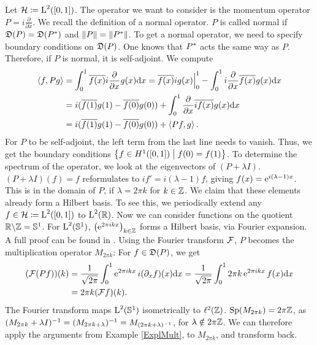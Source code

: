 \begin{expl}
 
 Let $\mathcal{H} \coloneqq \text{L}^2(\left[ 0, 1 \right])$. 
 The operator we want to consider is the momentum operator 
 $P = i \frac{\partial}{\partial x}$.
 We recall the definition of a normal operator.
 $P$ is called normal if $\mathfrak{D}(P) = \mathfrak{D}(P^{*})$ and 
 $\|P\| = \| P ^{*} \|$. To get a normal operator, we
 need to specify boundary conditions on $\mathfrak{D}(P)$. One knows that
 $P^{*}$ acts the same way as $P$. Therefore, if $P$ is normal,
 it is self-adjoint.
 We compute
 \begin{align*}
  \left\langle f, Pg \right\rangle 
 & =\int _0 ^1 \overline{f(x)} i \frac{\partial}{\partial x}g(x) \text{d}x
  = \overline{f(x)}ig(x)\Bigr|^{1}_{0}
  -\int _0 ^1 i \frac{\partial}{\partial x}\overline{f(x)} g(x) \text{d}x\\
&= i(\overline{f(1)}g(1)- \overline{f(0)}g(0))
+ \int _0 ^1 \frac{\partial}{\partial x}\overline{i f(x)} g(x) \text{d}x\\
&=i(\overline{f(1)}g(1)- \overline{f(0)}g(0)) 
+\left\langle Pf, g \right\rangle.
 \end{align*}
For $P$ to be self-adjoint, the left term from the last line needs 
to vanish. Thus, we get the boundary conditions 
 $\left\lbrace f \in H^1(\left[ 0,1 \right]) \bigm| f(0) = f(1) \right\rbrace$.
 To determine the spectrum of the operator, we look at 
 the eigenvectors of $(P+\lambda I)$.
 $(P+\lambda I)(f)=f$ reformulates to $i f' = i(\lambda - 1)f$, giving
 $f(x)= \operatorname{e}^{i(\lambda -1 )x}$. This is in the domain of $P$, if 
 $\lambda = 2\pi k$ for $k \in \mathbb{Z}$. We claim that these elements
 already form a Hilbert basis. To see this, we periodically
 extend any
 $f \in \mathcal{H} \coloneqq \text{L}^2(\left[ 0, 1 \right])$ to 
 $\text{L}^2(\mathbb{R})$. Now we can consider functions on the quotient 
 $\mathbb{R} \backslash \mathbb{Z} = \mathbb{S}^1$. For $\text{L}^2(\mathbb{S}^1)$,
 $\left(\operatorname{e}^{2\pi i k x }\right)_{k \in \mathbb{Z}}$ forms a Hilbert basis, via
 Fourier expansion. A full proof can be found in 
 \cite[Ch. V.4]{WernerFunkAna}.
 Using the Fourier transform $\mathcal{F}$, $P$ becomes the multiplication operator
 $M_{2 \pi k}$: For $f \in \mathfrak{D}(P)$, we get
 \begin{align*}
  (\mathcal{F}(Pf))(k)
  &= \frac{1}{\sqrt{2\pi}} \int _0 ^1 \operatorname{e}^{2\pi i k x}i(\partial_xf)(x)\text{d}x
  = \frac{1}{\sqrt{2\pi}} \int _0 ^1 2 \pi k \operatorname{e}^{2\pi i k x}f(x)\text{d}x \\
  &= 2 \pi k (\mathcal{F}f)(k).
 \end{align*}
The Fourier transform maps $\text{L}^2(\mathbb{S}^1)$ isometrically
to $\ell^2(\mathbb{Z})$. $\operatorname{Sp}(M_{2\pi k}) = 2\pi \mathbb{Z}$, as 
$(M_{2 \pi k } + \lambda I)^{-1} = (M_{2 \pi k + \lambda})^{-1}
= M_{(2 \pi k + \lambda)^{-1}}$, for $\lambda \notin 2\pi \mathbb{Z}$.
We can therefore apply the arguments from Example
\ref{ExplMult}, to $M_{2 \pi k}$, and transform back.

\end{expl}


